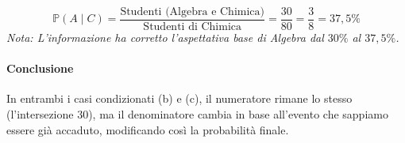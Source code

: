 \begin{esempio}
\[
\mathbb{P}(A \mid C) = \frac{\text{Studenti (Algebra e Chimica)}}{\text{Studenti di Chimica}} = \frac{30}{80} = \frac{3}{8} = 37,5\%
\]
\emph{Nota: L'informazione ha corretto l'aspettativa base di Algebra dal $30\%$ al $37,5\%$.}

\paragraph{Conclusione}
In entrambi i casi condizionati (b) e (c), il numeratore rimane lo stesso (l'intersezione $30$), ma il denominatore cambia in base all'evento che sappiamo essere già accaduto, modificando così la probabilità finale.

\end{esempio}

